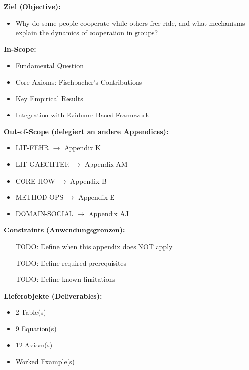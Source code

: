 
\begin{tcolorbox}[
    colback=orange!5!white,
    colframe=orange!75!black,
    title={\textbf{Appendix Scope: Ziel / In-Scope / Out-of-Scope / Constraints}},
    fonttitle=\bfseries
]

\textbf{Ziel (Objective):}
\begin{itemize}[nosep]
    \item Why do some people cooperate while others free-ride, and what mechanisms explain the dynamics of cooperation in groups?
\end{itemize}

\textbf{In-Scope:}
\begin{itemize}[nosep]
    \item Fundamental Question
    \item Core Axioms: Fischbacher's Contributions
    \item Key Empirical Results
    \item Integration with Evidence-Based Framework
\end{itemize}

\textbf{Out-of-Scope (delegiert an andere Appendices):}
\begin{itemize}[nosep]
    \item LIT-FEHR $\rightarrow$ Appendix K
    \item LIT-GAECHTER $\rightarrow$ Appendix AM
    \item CORE-HOW $\rightarrow$ Appendix B
    \item METHOD-OPS $\rightarrow$ Appendix E
    \item DOMAIN-SOCIAL $\rightarrow$ Appendix AJ
\end{itemize}

\textbf{Constraints (Anwendungsgrenzen):}
\begin{itemize}[nosep]
    \item [TODO: Define when this appendix does NOT apply]
    \item [TODO: Define required prerequisites]
    \item [TODO: Define known limitations]
\end{itemize}

\textbf{Lieferobjekte (Deliverables):}
\begin{itemize}[nosep]
    \item 2 Table(s)
    \item 9 Equation(s)
    \item 12 Axiom(s)
    \item Worked Example(s)
\end{itemize}

\end{tcolorbox}


